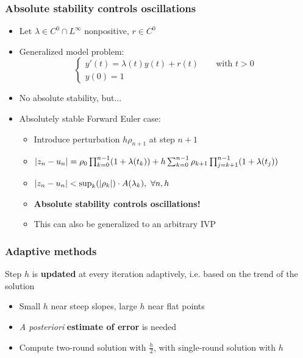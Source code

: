 \documentclass{beamer}
\begin{document}
\begin{frame} %
\frametitle{Absolute stability controls oscillations}
\begin{itemize}
	\item Let $\lambda \in C^0 \cap L^\infty$ nonpositive, $r \in C^0$
	\item Generalized model problem:
	$$
	\begin{cases}
		y'(t) = \lambda(t) y(t) + r(t) \qquad \text{with } t > 0 \\
		y(0) = 1
	\end{cases}
	$$
	\vspace{-10pt}
	\item No absolute stability, but...
	\pause
	\item Absolutely stable Forward Euler case:
	\begin{itemize}
		\item Introduce perturbation $h \rho_{n+1}$ at step $n+1$
		\item $\lvert z_n - u_n\rvert = \rho_0 \prod_{k=0}^{n-1} (1+\lambda(t_k)) +
		h \sum_{k=0}^{n-1} \rho_{k+1} \prod_{j=k+1}^{n-1} (1 + \lambda(t_j)) $
		\pause
		\item $\lvert z_n - u_n\rvert < \sup_k(\lvert\rho_k\rvert) \cdot A(\lambda_k), \ \forall n,h$
		\item \textbf{Absolute stability controls oscillations!}
		\item This can also be generalized to an arbitrary IVP
	\end{itemize}
\end{itemize}
\end{frame}


\begin{frame} %
	\frametitle{Adaptive methods}
	Step $h$ is \textbf{updated} at every iteration adaptively, i.e. based on the trend of the solution
	\begin{itemize}
		\item Small $h$ near steep slopes, large $h$ near flat points %
		\item \textit{A posteriori} \textbf{estimate of error} is needed
		\item Compute two-round solution with $\frac{h}{2}$, with single-round solution with $h$
	\end{itemize}
\end{frame}
\end{document}
